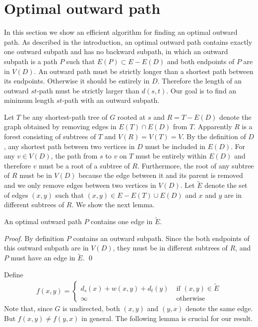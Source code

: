 \section{Optimal outward path}

In this section we show an efficient algorithm for finding an optimal outward path. As described in the introduction, an optimal outward path contains exactly one outward subpath and has no backward subpath, in which an outward subpath is a path $P$ such that $E(P)\subset E-E(D)$ and both endpoints of $P$ are in $V(D)$.
An outward path must be strictly longer than a shortest path between its endpoints. Otherwise it should be entirely in $D$. Therefore the length of an outward $st$-path must be strictly larger than $d(s,t)$. Our goal is to find an minimum length $st$-path with an outward subpath. 

Let $T$ be any shortest-path tree of $G$ rooted at $s$ and $R=T-E(D)$ denote the graph obtained by removing edges in $E(T)\cap E(D)$ from $T$.
Apparently $R$ is a forest consisting of subtrees of $T$ and $V(R)=V(T)=V$.
By the definition of $D$, any shortest path between two vertices in $D$ must be included in $E(D)$. For any $v\in V(D)$, the path from $s$ to $v$ on $T$ must be entirely within $E(D)$ and therefore $v$ must be a root of a subtree of $R$.
Furthermore, the root of any subtree of $R$ must be in $V(D)$ because the edge between it and its parent is removed and we only remove edges between two vertices in $V(D)$.
Let $\widetilde{E}$ denote the set of edges $(x,y)$ such that $(x,y)\in E-E(T)\cup E(D)$ and $x$ and $y$ are in different subtrees of $R$. 
We show the next lemma.

\begin{lemma}\label{out1}
An optimal outward path $P$ contains one edge in $\widetilde{E}$.
\end{lemma}
\begin{proof}
By definition $P$ contains an outward subpath. Since the both endpoints of this outward subpath are in $V(D)$, they must be in different subtrees of $R$, and $P$ must have an edge in $\widetilde{E}$.
\qed 
\end{proof}

Define 
\begin{eqnarray} 
f(x,y)=\left\{\begin{array}{ll}
d_s(x)+w(x,y)+d_t(y)\;& \mbox{if }(x,y)\in \widetilde{E}\\
\infty&\mbox{otherwise}
\end{array}
\right.
\end{eqnarray}
Note that, since $G$ is undirected, both $(x,y)$ and $(y,x)$ denote the same edge. But $f(x,y)\neq f(y,x)$ in general. The following lemma is crucial for our result. 


